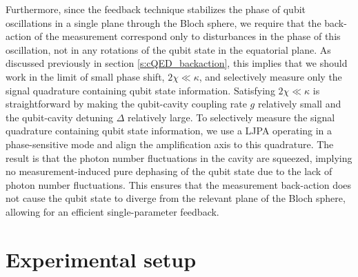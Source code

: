 Furthermore, since the feedback technique stabilizes the phase of qubit oscillations in a single plane through the Bloch sphere, we require that the back-action of the measurement correspond only to disturbances in the phase of this oscillation, not in any rotations of the qubit state in the equatorial plane.  As discussed previously in section \ref{s:cQED_backaction}, this implies that we should work in the limit of small phase shift, $2 \chi \ll \kappa$, and selectively measure only the signal quadrature containing qubit state information.  Satisfying $2 \chi \ll \kappa$ is straightforward by making the qubit-cavity coupling rate $g$ relatively small and the qubit-cavity detuning $\Delta$ relatively large.  To selectively measure the signal quadrature containing qubit state information, we use a LJPA operating in a phase-sensitive mode and align the amplification axis to this quadrature.  The result is that the photon number fluctuations in the cavity are squeezed, implying no measurement-induced pure dephasing of the qubit state due to the lack of photon number fluctuations.  This ensures that the measurement back-action does not cause the qubit state to diverge from the relevant plane of the Bloch sphere, allowing for an efficient single-parameter feedback.

\section{Experimental setup}

